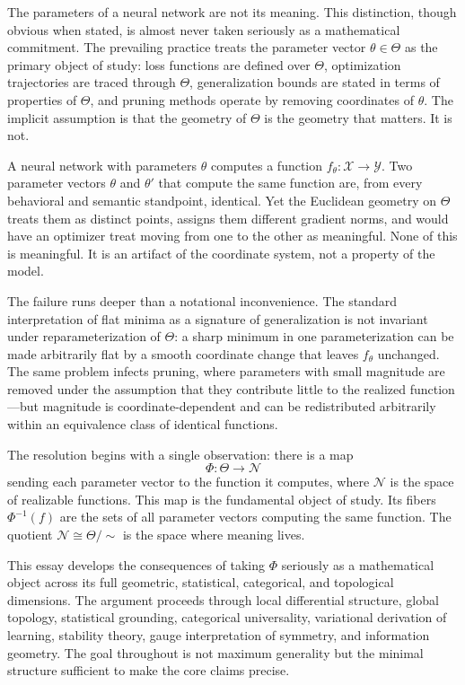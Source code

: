 \documentclass[twocolumn,10pt]{article}
\theoremstyle{thmstyle}
\theoremstyle{defstyle}
\begin{document}
The parameters of a neural network are not its meaning. This
distinction, though obvious when stated, is almost never taken seriously
as a mathematical commitment. The prevailing practice treats the
parameter vector $\theta \in \Theta$ as the primary object of study:
loss functions are defined over $\Theta$, optimization trajectories are
traced through $\Theta$, generalization bounds are stated in terms of
properties of $\Theta$, and pruning methods operate by removing
coordinates of $\theta$. The implicit assumption is that the geometry of
$\Theta$ is the geometry that matters. It is not.

A neural network with parameters $\theta$ computes a function
$f_\theta : \mathcal{X} \to \mathcal{Y}$. Two parameter vectors $\theta$
and $\theta'$ that compute the same function are, from every behavioral
and semantic standpoint, identical. Yet the Euclidean geometry on
$\Theta$ treats them as distinct points, assigns them different gradient
norms, and would have an optimizer treat moving from one to the other as
meaningful. None of this is meaningful. It is an artifact of the
coordinate system, not a property of the model.

The failure runs deeper than a notational inconvenience. The standard
interpretation of flat minima as a signature of generalization is not
invariant under reparameterization of $\Theta$: a sharp minimum in one
parameterization can be made arbitrarily flat by a smooth coordinate
change that leaves $f_\theta$ unchanged. The same problem infects
pruning, where parameters with small magnitude are removed under the
assumption that they contribute little to the realized function---but
magnitude is coordinate-dependent and can be redistributed arbitrarily
within an equivalence class of identical functions.

The resolution begins with a single observation: there is a map
\[
\Phi : \Theta \to \mathcal{N}
\]
sending each parameter vector to the function it computes, where
$\mathcal{N}$ is the space of realizable functions. This map is the
fundamental object of study. Its fibers $\Phi^{-1}(f)$ are the sets of
all parameter vectors computing the same function. The quotient
$\mathcal{N} \cong \Theta/{\sim}$ is the space where meaning lives.

This essay develops the consequences of taking $\Phi$ seriously as a
mathematical object across its full geometric, statistical, categorical,
and topological dimensions. The argument proceeds through local
differential structure, global topology, statistical grounding,
categorical universality, variational derivation of learning, stability
theory, gauge interpretation of symmetry, and information geometry. The
goal throughout is not maximum generality but the minimal structure
sufficient to make the core claims precise.
\end{document}
